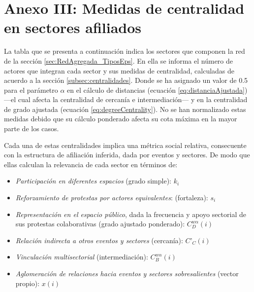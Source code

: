 \documentclass[letterpaper, 11pt]{book}
\theoremstyle{definition}
\theoremstyle{remark}
\begin{document}
{{{{{{{{{{\chapter*{Anexo III: Medidas de centralidad en sectores afiliados}
\label{AnexoIII}


La tabla que se presenta a continuación indica los sectores que componen la red de la sección \ref{sec:RedAgregada_TiposEps}. 
En ella se informa el número de actores que integran cada sector y sus medidas de centralidad, calculadas de acuerdo a la sección \ref{subsec:centralidades}. 
Donde se ha asignado un valor de 0.5 para el parámetro $\alpha$ en el cálculo de distancias (ecuación \ref{eq:distanciaAjustada}) ---el cual afecta la centralidad de cercanía e intermediación--- y en la centralidad de grado ajustada (ecuación \ref{eq:degreeCentrality}).
No se han normalizado estas medidas debido que su cálculo ponderado afecta su cota máxima en la mayor parte de los casos. 


Cada una de estas centralidades implica una métrica social relativa, consecuente con la estructura de afiliación inferida, dada por eventos y sectores. 
De modo que ellas calculan la relevancia de cada sector en términos de: 
\begin{itemize}
    \setlength\itemsep{0em}
    \item \emph{Participación en diferentes espacios} (grado simple): $k_{i}$
    \item \emph{Reforzamiento de protestas por actores equivalentes}: (fortaleza): $s_{i}$
    \item \emph{Representación en el espacio público}, dada la frecuencia y apoyo sectorial de sus protestas colaborativas (grado ajustado ponderado): $C_{D}^{w\alpha}(i)$
    \item \emph{Relación indirecta a otros eventos y sectores} (cercanía): $C’_{C}(i)$
    \item \emph{Vinculación multisectorial} (intermediación): $C_{B}^{w\alpha}(i)$
    \item \emph{Aglomeración de relaciones hacia eventos y sectores sobresalientes} (vector propio): $x(i)$
\end{itemize}




}}}}}}}}}}
\end{document}
